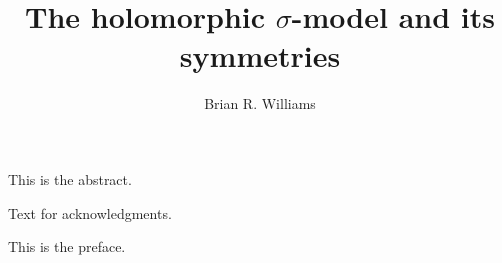 \documentclass[12pt]{nuthesis}	%
\author{Brian R. Williams}
\title{The holomorphic $\sigma$-model and its symmetries}
\begin{document}
%	
%


\frontmatter		%

\maketitle		%

\copyrightpage		%


\abstract		%

This is the abstract.

\acknowledgements	%

Text for acknowledgments.

\preface		%

This is the preface.


%
%
%
%
%
%
%
%

\clearpage{} %
\tableofcontents	%

\clearpage{} %
\listoftables		%

\clearpage{} %
\listoffigures		%



\mainmatter             %










%  

\end{document}
